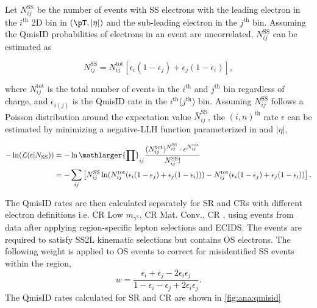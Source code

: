 \documentclass[../thesis.tex]{subfiles}
\begin{document}
Let $N_{ij}^\mathrm{SS}$ be the number of events with \acs{SS} electrons with the leading electron in the $i^\mathrm{th}$ 2D bin in $(\pT,|\eta|)$ and the sub-leading electron in the $j^\mathrm{th}$ bin. Assuming the \acs{QmisID} probabilities of electrons in an event are uncorrelated, $N_{ij}^\mathrm{SS}$ can be estimated as

\begin{equation}
N_{ij}^\mathrm{SS} = N_{ij}^\mathrm{tot} \left[\epsilon_i(1-\epsilon_j) + \epsilon_j(1-\epsilon_i)\right],
\end{equation}

where $N_{ij}^\mathrm{tot}$ is the total number of events in the $i^\mathrm{th}$ and $j^\mathrm{th}$ bin regardless of charge, and $\epsilon_{i(j)}$ is the \acs{QmisID} rate in the $i^\mathrm{th}$($j^\mathrm{th}$) bin. Assuming $N_{ij}^\mathrm{SS}$ follows a Poisson distribution around the expectation value $\bar{N}_{ij}^\mathrm{SS}$, the $(i,n)^\text{th}$ rate $\epsilon$ can be estimated by minimizing a negative-\acs{LLH} function parameterized in \pT and $|\eta|$,

\begin{equation}
\label{eq:qmisid_llh}
\begin{aligned}
-\ln (\mathcal{L}(\epsilon | N_\mathrm{SS})) 
&= -\ln \mathlarger{\prod}_{ij} \frac{(N_{ij}^\mathrm{tot})^{N_{ij}^\mathrm{SS}} \cdot e^{N_{ij}^\mathrm{tot}}}{N_{ij}^\mathrm{SS}!} \\
&= -\sum_{ij} \left[
N_{ij}^\mathrm{SS} \ln (
N_{ij}^\mathrm{tot}( \epsilon_i(1-\epsilon_j)+\epsilon_j(1-\epsilon_i) )) - 
N_{ij}^\mathrm{tot}( \epsilon_i(1-\epsilon_j)+\epsilon_j(1-\epsilon_i) ) \right].
\end{aligned}
\end{equation}

The \acs{QmisID} rates are then calculated separately for \acs{SR} and \acs{CR}s with different electron definitions i.e. \acs{CR} Low $m_{\gamma^{*}}$, \acs{CR} Mat. Conv., \acs{CR} \ttWpm, using events from data after applying region-specific lepton selections and \acs{ECIDS}. The events are required to satisfy \acs{SS2L} kinematic selections but contains \acs{OS} electrons. The following weight is applied to \acs{OS} events to correct for misidentified \acs{SS} events within the region,
\begin{equation}
w = \frac{\epsilon_i+\epsilon_j-2\epsilon_i\epsilon_j}{1-\epsilon_i-\epsilon_j+2\epsilon_i\epsilon_j}.
\end{equation}
The \acs{QmisID} rates calculated for \acs{SR} and \acs{CR} \ttW are shown in \autoref{fig:ana:qmisid}
\end{document}

